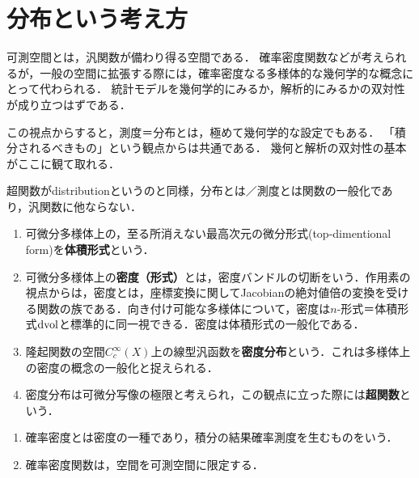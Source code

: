 \documentclass[uplatex,dvipdfmx]{jsreport}
\begin{document}
\section{分布という考え方}

\begin{tcolorbox}[colframe=ForestGreen, colback=ForestGreen!10!white,breakable,colbacktitle=ForestGreen!40!white,coltitle=black,fonttitle=\bfseries\sffamily,
title=]
    可測空間とは，汎関数が備わり得る空間である．
    確率密度関数などが考えられるが，一般の空間に拡張する際には，確率密度なる多様体的な幾何学的な概念にとって代わられる．
    統計モデルを幾何学的にみるか，解析的にみるかの双対性が成り立つはずである．

    この視点からすると，測度＝分布とは，極めて幾何学的な設定でもある．
    「積分されるべきもの」という観点からは共通である．
    幾何と解析の双対性の基本がここに観て取れる．
\end{tcolorbox}

超関数がdistributionというのと同様，分布とは／測度とは関数の一般化であり，汎関数に他ならない．

\begin{definition}\mbox{}
    \begin{enumerate}
        \item 可微分多様体上の，至る所消えない最高次元の微分形式(top-dimentional form)を\textbf{体積形式}という．
        \item 可微分多様体上の\textbf{密度（形式）}とは，密度バンドルの切断をいう．作用素の視点からは，密度とは，座標変換に関してJacobianの絶対値倍の変換を受ける関数の族である．向き付け可能な多様体について，密度は$n$-形式＝体積形式$\mathrm{dvol}$と標準的に同一視できる．密度は体積形式の一般化である．
        \item 隆起関数の空間$C_c^\infty(X)$上の線型汎函数を\textbf{密度分布}という．これは多様体上の密度の概念の一般化と捉えられる．
        \item 密度分布は可微分写像の極限と考えられ，この観点に立った際には\textbf{超関数}という．
    \end{enumerate}
\end{definition}

\begin{example}\mbox{}
    \begin{enumerate}
        \item 確率密度とは密度の一種であり，積分の結果確率測度を生むものをいう．
        \item 確率密度関数は，空間を可測空間に限定する．
    \end{enumerate}
\end{example}
\end{document}
